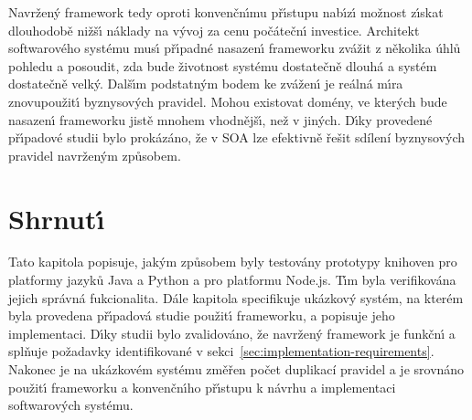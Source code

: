 Navržen\'y framework tedy oproti konvenčn\'{\i}mu př\'{\i}stupu nab\'{\i}z\'{\i} možnost z\'{\i}skat dlouhodobě
nižš\'{\i} náklady na v\'yvoj za cenu počátečn\'{\i} investice. Architekt softwarového systému mus\'{\i} př\'{\i}padné nasazen\'{\i}
frameworku zvážit z několika úhlů pohledu a posoudit, zda bude životnost systému dostatečně dlouhá a systém
dostatečně velk\'y. Dalš\'{\i}m podstatn\'ym bodem ke zvážen\'{\i} je reálná m\'{\i}ra znovupoužit\'{\i} byznysov\'ych pravidel.
Mohou existovat domény, ve kter\'ych bude nasazen\'{\i} frameworku jistě mnohem vhodnějš\'{\i}, než v jin\'ych.
D\'{\i}ky provedené př\'{\i}padové studii bylo prokázáno, že v \gls{SOA} lze efektivně řešit sdílení byznysov\'ych pravidel
navržen\'ym způsobem.

\section{Shrnut\'{\i}}

Tato kapitola popisuje, jak\'ym způsobem byly testovány prototypy knihoven
pro platformy jazyků Java a Python a pro platformu Node.js. T\'{\i}m byla verifikována
jejich správná fukcionalita. Dále kapitola specifikuje ukázkový systém, na kterém byla provedena př\'{\i}padová studie použit\'{\i} frameworku,
a popisuje jeho implementaci. D\'{\i}ky studii bylo zvalidováno, že navržen\'y framework je funkčn\'{\i}
a splňuje požadavky identifikované v sekci~\ref{sec:implementation-requirements}.
Nakonec je na ukázkovém systému změřen počet duplikací pravidel a je srovnáno použit\'{\i} frameworku
a konvenčn\'{\i}ho př\'{\i}stupu k návrhu a implementaci softwarov\'ych systému.
